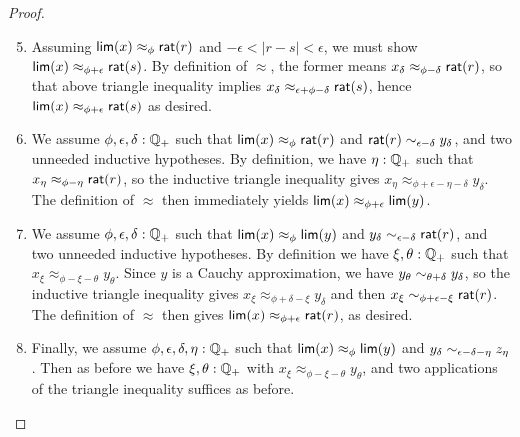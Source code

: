 \begin{proof}
  \begin{enumerate}\setcounter{enumi}{4}
  \item Assuming $\mathsf{lim}(x)\approx_\phi \mathsf{rat}(r)$ and $-\epsilon<|r-s|<\epsilon$, we must show $\mathsf{lim}(x)\approx_{\phi+\epsilon} \mathsf{rat}(s)$.
    By definition of $\approx$, the former means $x_\delta \approx_{\phi-\delta} \mathsf{rat}(r)$, so that above triangle inequality implies $x_\delta \approx_{\epsilon+\phi-\delta} \mathsf{rat}(s)$, hence $\mathsf{lim}(x)\approx_{\phi+\epsilon} \mathsf{rat}(s)$ as desired.
  \item We assume $\phi,\epsilon,\delta:\mathbb{Q}_{+}$ such that $\mathsf{lim}(x)\approx_\phi \mathsf{rat}(r)$ and $\mathsf{rat}(r) \sim_{\epsilon-\delta} y_\delta$, and two unneeded inductive hypotheses.
    By definition, we have $\eta:\mathbb{Q}_{+}$ such that $x_\eta \approx_{\phi-\eta} \mathsf{rat}(r)$, so the inductive triangle inequality gives $x_\eta \approx_{\phi+\epsilon-\eta-\delta} y_\delta$.
    The definition of $\approx$ then immediately yields $\mathsf{lim}(x) \approx_{\phi+\epsilon} \mathsf{lim}(y)$.
  \item We assume $\phi,\epsilon,\delta:\mathbb{Q}_{+}$ such that $\mathsf{lim}(x)\approx_\phi \mathsf{lim}(y)$ and $y_\delta \sim_{\epsilon-\delta} \mathsf{rat}(r)$, and two unneeded inductive hypotheses.
    By definition we have $\xi,\theta:\mathbb{Q}_{+}$ such that $x_\xi \approx_{\phi-\xi-\theta} y_\theta$.
    Since $y$ is a Cauchy approximation, we have $y_\theta \sim_{\theta+\delta} y_\delta$, so the inductive triangle inequality gives $x_\xi \approx_{\phi+\delta-\xi} y_\delta$ and then $x_\xi \sim_{\phi+\epsilon-\xi} \mathsf{rat}(r)$.
    The definition of $\approx$ then gives $\mathsf{lim}(x) \approx_{\phi+\epsilon}\mathsf{rat}(r)$, as desired.
  \item Finally, we assume $\phi,\epsilon,\delta,\eta:\mathbb{Q}_{+}$ such that $\mathsf{lim}(x)\approx_\phi \mathsf{lim}(y)$ and $y_\delta \sim_{\epsilon-\delta-\eta} z_\eta$.
    Then as before we have $\xi,\theta:\mathbb{Q}_{+}$ with $x_\xi \approx_{\phi-\xi-\theta} y_\theta$, and two applications of the triangle inequality suffices as before.
  \end{enumerate}


\end{proof}
